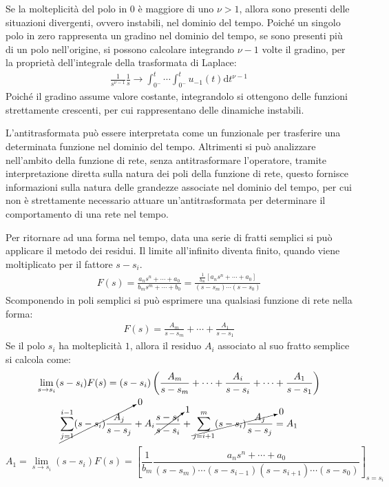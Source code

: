 \documentclass{article}
\newcommand{\df}{\mathrm{d}}
\numberwithin{equation}{subsection}
\begin{document}
Se la molteplicità del polo in $0$ è maggiore di uno $\nu>1$, allora sono presenti delle situazioni divergenti, ovvero instabili, nel dominio del tempo. Poiché un singolo 
polo in zero rappresenta un gradino nel dominio del tempo, se sono presenti più di un polo nell'origine, si possono calcolare integrando $\nu-1$ volte il gradino, per la 
proprietà dell'integrale della trasformata di Laplace:
\begin{gather*}
    \displaystyle\frac{1}{s^{\nu-1}}\frac{1}{s}\to\int_{0^-}^t\cdots\int_{0^-}^tu_{-1}(t)\df t^{\nu-1}
\end{gather*}
Poiché il gradino assume valore costante, integrandolo si ottengono delle funzioni strettamente crescenti, per cui rappresentano delle dinamiche instabili. 


L'antitrasformata può essere interpretata come un funzionale per trasferire una determinata funzione nel dominio del tempo. Altrimenti si può analizzare nell'ambito della 
funzione di rete, senza antitrasformare l'operatore, tramite interpretazione diretta sulla natura dei poli della funzione di rete, questo fornisce informazioni sulla 
natura delle grandezze associate nel dominio del tempo, per cui non è strettamente necessario attuare un'antitrasformata per determinare il comportamento di una rete 
nel tempo. 

Per ritornare ad una forma nel tempo, data una serie di fratti semplici si può applicare il metodo dei residui. 
Il limite all'infinito diventa finito, quando viene moltiplicato per il fattore $s-s_i$. %
\begin{gather*}
    F(s)=\displaystyle\frac{a_ns^n+\cdots+a_0}{b_ms^m+\cdots+b_0}=\frac{\displaystyle\frac{1}{b_m}\left[a_ns^n+\cdots+a_0\right]}{(s-s_m)\cdots(s-s_0)}
\end{gather*}
Scomponendo in poli semplici si può esprimere una qualsiasi funzione di rete nella forma:
\begin{gather*}
    F(s)=\displaystyle\frac{A_m}{s-s_m}+\cdots+\frac{A_1}{s-s_1}
\end{gather*}
Se il polo $s_i$ ha molteplicità $1$, allora il residuo $A_i$ associato al suo fratto semplice si calcola come:
\begin{gather*}
    \lim_{s\to s_i}(s-s_i)F(s)=(s-s_i)\left(\displaystyle\frac{A_m}{s-s_m}+\cdots+\frac{A_i}{s-s_i}+\cdots+\frac{A_1}{s-s_1}\right)\\
    \displaystyle\cancelto{0}{\sum_{j=1}^{i-1}(s-s_i)\frac{A_j}{s-s_j}}+A_i\cancelto{1}{\frac{s-s_i}{s-s_i}}+\cancelto{0}{\sum_{j=i+1}^{m}(s-s_i)\frac{A_j}{s-s_j}}=A_1
\end{gather*}
\begin{equation}
    A_1=\lim_{s\to s_i}(s-s_i)F(s)=\left[\displaystyle\frac{1}{b_m}\frac{a_ns^n+\cdots+a_0}{(s-s_m)\cdots(s-s_{i-1})(s-s_{i+1})\cdots(s-s_0)}\right]_{s=s_i}
\end{equation}
\end{document}
